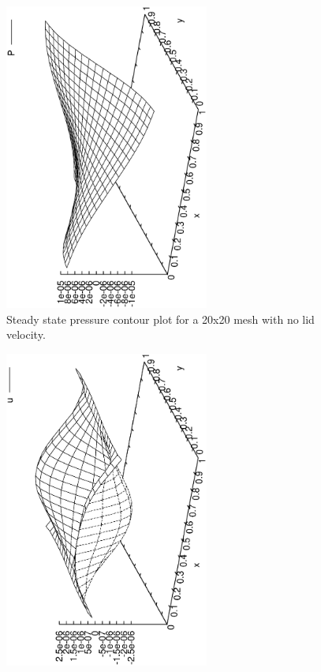\documentclass[a4paper, 10pt]{article}
\begin{document}
\begin{enumerate}[I]
    \begin{figure}
      \centering
      \includegraphics[width=0.6\textwidth, angle = -90]{../plot/stability/solution/P.eps}
      \caption{Steady state pressure contour plot for a 20x20 mesh with no lid velocity.}
      \label{sol1p}
    \end{figure}
    \begin{figure}
      \centering
      \includegraphics[width=0.6\textwidth, angle = -90]{../plot/stability/solution/u.eps}

\end{figure}
\end{enumerate}
\end{document}
